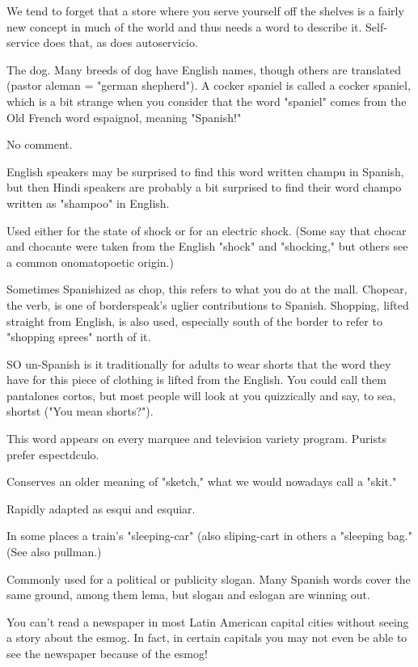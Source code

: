  We tend to forget that a store where you serve
yourself off the shelves is a fairly new concept in much of the world
and thus needs a word to describe it. Self-service does that, as does
autoservicio.

 The dog. Many breeds of dog have English names,
though others are translated (pastor aleman = "german shepherd"). A
cocker spaniel is called a cocker spaniel, which is a bit strange when
you consider that the word "spaniel" comes from the Old French word
espaignol, meaning "Spanish!"

 No comment.

 English speakers may be surprised to find this
word written champu in Spanish, but then Hindi speakers are probably
a bit surprised to find their word champo written as "shampoo" in
English.

 Used either for the state of shock or for an electric
shock. (Some say that chocar and chocante were taken from the English "shock" and "shocking," but others see a common onomatopoetic origin.)

 Sometimes Spanishized as chop, this refers to what
you do at the mall. Chopear, the verb, is one of borderspeak's uglier
contributions to Spanish. Shopping, lifted straight from English, is also
used, especially south of the border to refer to "shopping sprees" north
of it.

 SO un-Spanish is it traditionally for adults to wear
shorts that the word they have for this piece of clothing is lifted
from the English. You could call them pantalones cortos, but most
people will look at you quizzically and say, to sea, shortst ("You mean
shorts?").

 This word appears on every marquee and television
variety program. Purists prefer espectdculo.

 Conserves an older meaning of "sketch," what we
would nowadays call a "skit."

 Rapidly adapted as esqui and esquiar.

 In some places a train's "sleeping-car" (also
sliping-cart in others a "sleeping bag." (See also pullman.)

 Commonly used for a political or publicity slogan.
Many Spanish words cover the same ground, among them lema, but
slogan and eslogan are winning out.

 You can't read a newspaper in most Latin American
capital cities without seeing a story about the esmog. In fact, in certain capitals you may not even be able to see the newspaper because
of the esmog!

